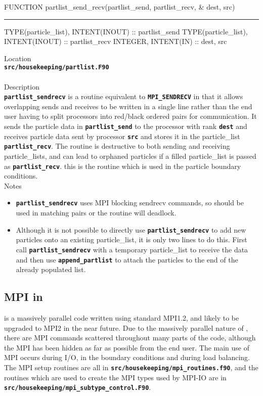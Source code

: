 \documentclass[12pt,a4paper]{article}
\newcommand{\HRule}{\rule[0.3cm]{\linewidth}{0.5mm}}
\newcommand{\inlinecode}[1]{{\color{warwickred} \bf\texttt{#1}}}
\newcommand{\EPOCH}{{\color{warwickdark}\fontfamily{phv}\selectfont{EPOCH}}}
\begin{document}
\pagebreak
\begin{codedef}
FUNCTION partlist_send_recv(partlist_send, partlist_recv, &
    dest, src)
\HRule
TYPE(particle_list), INTENT(INOUT) :: partlist_send
TYPE(particle_list), INTENT(INOUT) :: partlist_recv
INTEGER, INTENT(IN) :: dest, src
\end{codedef}
\vspace{1cm}
{\Large Location\\}
\inlinecode{src/housekeeping/partlist.F90}\\
\\[0.5cm]
{\Large Description\\}
\inlinecode{partlist\_sendrecv} is a routine equivalent to
\inlinecode{MPI\_SENDRECV} in that it allows overlapping sends and receives to
be written in a single line rather than the end user having to split processors
into red/black ordered pairs for communication. It sends the particle data in
\inlinecode{partlist\_send} to the processor with rank \inlinecode{dest} and
receives particle data sent by processor \inlinecode{src} and stores it in the
particle\_list \inlinecode{partlist\_recv}. The routine is destructive to both
sending and receiving particle\_lists, and can lead to orphaned particles if a
filled particle\_list is passed as \inlinecode{partlist\_recv}. this is the
routine which is used in the particle boundary conditions.
\\[0.5cm]
{\Large Notes\\}
\begin{itemize}
\item \inlinecode{partlist\_sendrecv} uses MPI blocking sendrecv commands, so
  should be used in matching pairs or the routine will deadlock.

\item Although it is not possible to directly use
  \inlinecode{partlist\_sendrecv} to add new particles onto an existing
  particle\_list, it is only two lines to do this. First call
  \inlinecode{partlist\_sendrecv} with a temporary particle\_list to receive the
  data and then use \inlinecode{append\_partlist} to attach the particles to
  the end of the already populated list.
\end{itemize}
\pagebreak


\subsection{MPI in {\EPOCH}}
{\EPOCH} is a massively parallel code written using standard MPI1.2, and likely
to be upgraded to MPI2 in the near future. Due to the massively parallel nature
of {\EPOCH}, there are MPI commands scattered throughout many parts of the code,
although the MPI has been hidden as far as possible from the end user. The main
use of MPI occurs during I/O, in the boundary conditions and during load
balancing. The MPI setup routines are all in
\inlinecode{src/housekeeping/mpi\_routines.f90}, and the routines which are
used to create the MPI types used by MPI-IO are in
\inlinecode{src/housekeeping/mpi\_subtype\_control.F90}.
\end{document}
